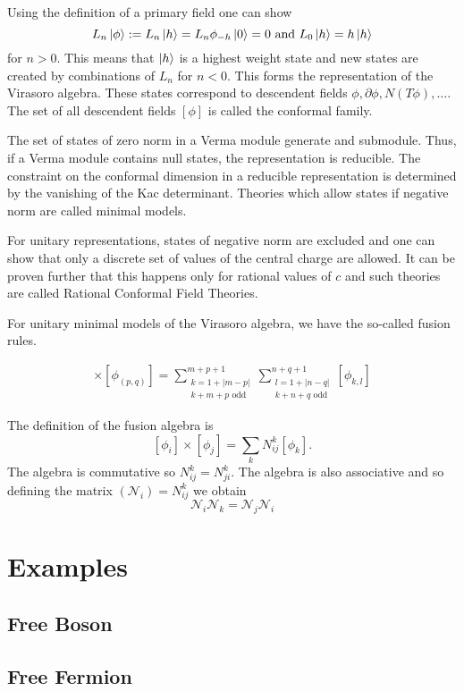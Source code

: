 \documentclass{article}
\begin{document}
Using the definition of a primary field one can show $$L_n\ket{\phi}:=L_n\ket{h}=L_n\phi_{-h}\ket{0}=0 \text{ and } L_0\ket{h}=h\ket{h}$$ for $n>0$. This means that $\ket{h}$ is a highest weight state and new states are created by combinations of $L_n$ for $n<0$. This forms the representation of the Virasoro algebra. These states correspond to descendent fields $\phi, \partial\phi, N(T\phi), \dots$. The set of all descendent fields $[\phi]$ is called the conformal family. 

The set of states of zero norm in a Verma module generate and submodule. Thus, if a Verma module contains null states, the representation is reducible. The constraint on the conformal dimension in a reducible representation is determined by the vanishing of the Kac determinant. Theories which allow states if negative norm are called minimal models. 

For unitary representations, states of negative norm are excluded and one can show that only a discrete set of values of the central charge are allowed. It can be proven further that this happens only for rational values of $c$ and such theories are called Rational Conformal Field Theories.  

For unitary minimal models of the Virasoro algebra, we have the so-called fusion rules.

\begin{align*}
    [\phi_{(m,n)}] \times [\phi_{(p,q)}]=\sum_{\substack{k=1+|m-p|\\k+m+p \text{ odd}}}^{m+p+1}\sum_{\substack{l=1+|n-q|\\k+n+q \text{ odd}}}^{n+q+1}[\phi_{k,l}]
\end{align*}

The definition of the fusion algebra is $$[\phi_i] \times [\phi_j]=\sum_kN^k_{ij}[\phi_k].$$ The algebra is commutative so $N^k_{ij}=N^k_{ji}$. The algebra is also associative and so defining the matrix $(\mathcal{N}_i)=N^k_{ij}$ we obtain $$\mathcal{N}_i\mathcal{N}_k=\mathcal{N}_j\mathcal{N}_i$$


\section{Examples}
\subsection{Free Boson}

\subsection{Free Fermion}
\end{document}
